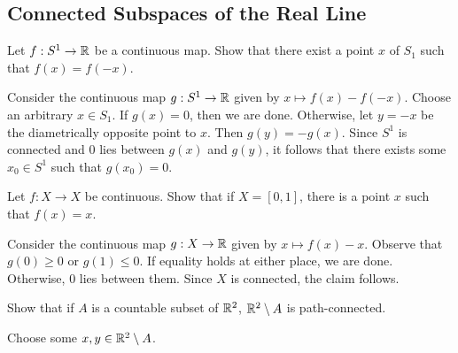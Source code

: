 
\subsection{Connected Subspaces of the Real Line}

	\setcounter{exercise}{1}
	\begin{exercise}
		Let $f:S^1\to\mathbb{R}$ be a continuous map. Show that there exist a point $x$ of $S_1$ such that $f(x)=f(-x)$.
	\end{exercise}
	\begin{solution*}
		Consider the continuous map $g:S^1\to\mathbb{R}$ given by $x\mapsto f(x)-f(-x)$. Choose an arbitrary $x\in S_1$. If $g(x)=0$, then we are done. Otherwise, let $y=-x$ be the diametrically opposite point to $x$. Then $g(y)=-g(x)$. Since $S^1$ is connected and $0$ lies between $g(x)$ and $g(y)$, it follows that there exists some $x_0\in S^1$ such that $g(x_0)=0$.
	\end{solution*}

	\begin{exercise}
		Let $f:X\to X$ be continuous. Show that if $X=[0,1]$, there is a point $x$ such that $f(x)=x$.
	\end{exercise}
	\begin{solution*}
		Consider the continuous map $g:X\to\mathbb{R}$ given by $x\mapsto f(x)-x$. Observe that $g(0)\geq 0$ or $g(1)\leq 0$. If equality holds at either place, we are done. Otherwise, $0$ lies between them. Since $X$ is connected, the claim follows.
	\end{solution*}

	\begin{exercise}
		Show that if $A$ is a countable subset of $\mathbb{R}^2$, $\mathbb{R}^2\setminus A$ is path-connected.
	\end{exercise}
	\begin{solution*}
		Choose some $x,y\in\mathbb{R}^2\setminus A$.
	\end{solution*}

